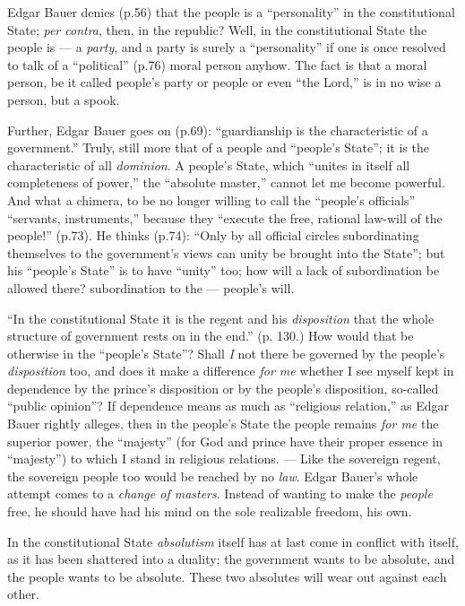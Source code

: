 Edgar Bauer denies (p.56) that the people is a ``personality'' in the 
constitutional State; \textit{per contra}, then, in the republic? Well, in the 
constitutional State the people is --- a \textit{party}, and a party is surely 
a ``personality'' if one is once resolved to talk of a ``political'' 
(p.76) moral person anyhow. The fact is that a moral person, be it called 
people's party or people or even ``the Lord,'' is in no wise a person, but a 
spook.

Further, Edgar Bauer goes on (p.69): ``guardianship is the characteristic of 
a government.'' Truly, still more that of a people and ``people's State''; 
it is the characteristic of all \textit{dominion}. A people's State, which 
``unites in itself all completeness of power,'' the ``absolute master,'' 
cannot let me become powerful. And what a chimera, to be no longer willing to 
call the ``people's officials'' ``servants, instruments,'' because they 
``execute the free, rational law-will of the people!'' (p.73). He thinks 
(p.74): ``Only by all official circles subordinating themselves to the 
government's views can unity be brought into the State''; but his ``people's 
State'' is to have ``unity'' too; how will a lack of subordination be 
allowed there? subordination to the --- people's will.

``In the constitutional State it is the regent and his \textit{disposition} 
that the whole structure of government rests on in the end.'' (p. 130.) How 
would that be otherwise in the ``people's State''? Shall \textit{I} not 
there be governed by the people's \textit{disposition} too, and does it make a 
difference \textit{for me} whether I see myself kept in dependence by the 
prince's disposition or by the people's disposition, so-called ``public 
opinion''? If dependence means as much as ``religious relation,'' as Edgar 
Bauer rightly alleges, then in the people's State the people remains 
\textit{for me} the superior power, the ``majesty'' (for God and prince have 
their proper essence in ``majesty'') to which I stand in religious 
relations. --- Like the sovereign regent, the sovereign people too would be 
reached by no \textit{law}. Edgar Bauer's whole attempt comes to a 
\textit{change of masters}. Instead of wanting to make the \textit{people} 
free, he should have had his mind on the sole realizable freedom, his own.

In the constitutional State \textit{absolutism} itself has at last come in 
conflict with itself, as it has been shattered into a duality; the government 
wants to be absolute, and the people wants to be absolute. These two absolutes 
will wear out against each other.

